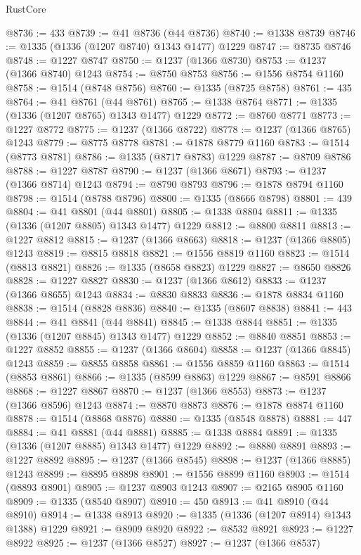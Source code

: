 \begin{lexlean}{RustCore}
\begin{coremodule}
@8736 := 433
@8739 := @41 @8736 (@44 @8736)
@8740 := @1338 @8739
@8746 := @1335 (@1336 (@1207 @8740) @1343 @1477) @1229
@8747 := @8735 @8746
@8748 := @1227 @8747
@8750 := @1237 (@1366 @8730)
@8753 := @1237 (@1366 @8740) @1243
@8754 := @8750 @8753
@8756 := @1556 @8754 @1160
@8758 := @1514 (@8748 @8756)
@8760 := @1335 (@8725 @8758)
@8761 := 435
@8764 := @41 @8761 (@44 @8761)
@8765 := @1338 @8764
@8771 := @1335 (@1336 (@1207 @8765) @1343 @1477) @1229
@8772 := @8760 @8771
@8773 := @1227 @8772
@8775 := @1237 (@1366 @8722)
@8778 := @1237 (@1366 @8765) @1243
@8779 := @8775 @8778
@8781 := @1878 @8779 @1160
@8783 := @1514 (@8773 @8781)
@8786 := @1335 (@8717 @8783) @1229
@8787 := @8709 @8786
@8788 := @1227 @8787
@8790 := @1237 (@1366 @8671)
@8793 := @1237 (@1366 @8714) @1243
@8794 := @8790 @8793
@8796 := @1878 @8794 @1160
@8798 := @1514 (@8788 @8796)
@8800 := @1335 (@8666 @8798)
@8801 := 439
@8804 := @41 @8801 (@44 @8801)
@8805 := @1338 @8804
@8811 := @1335 (@1336 (@1207 @8805) @1343 @1477) @1229
@8812 := @8800 @8811
@8813 := @1227 @8812
@8815 := @1237 (@1366 @8663)
@8818 := @1237 (@1366 @8805) @1243
@8819 := @8815 @8818
@8821 := @1556 @8819 @1160
@8823 := @1514 (@8813 @8821)
@8826 := @1335 (@8658 @8823) @1229
@8827 := @8650 @8826
@8828 := @1227 @8827
@8830 := @1237 (@1366 @8612)
@8833 := @1237 (@1366 @8655) @1243
@8834 := @8830 @8833
@8836 := @1878 @8834 @1160
@8838 := @1514 (@8828 @8836)
@8840 := @1335 (@8607 @8838)
@8841 := 443
@8844 := @41 @8841 (@44 @8841)
@8845 := @1338 @8844
@8851 := @1335 (@1336 (@1207 @8845) @1343 @1477) @1229
@8852 := @8840 @8851
@8853 := @1227 @8852
@8855 := @1237 (@1366 @8604)
@8858 := @1237 (@1366 @8845) @1243
@8859 := @8855 @8858
@8861 := @1556 @8859 @1160
@8863 := @1514 (@8853 @8861)
@8866 := @1335 (@8599 @8863) @1229
@8867 := @8591 @8866
@8868 := @1227 @8867
@8870 := @1237 (@1366 @8553)
@8873 := @1237 (@1366 @8596) @1243
@8874 := @8870 @8873
@8876 := @1878 @8874 @1160
@8878 := @1514 (@8868 @8876)
@8880 := @1335 (@8548 @8878)
@8881 := 447
@8884 := @41 @8881 (@44 @8881)
@8885 := @1338 @8884
@8891 := @1335 (@1336 (@1207 @8885) @1343 @1477) @1229
@8892 := @8880 @8891
@8893 := @1227 @8892
@8895 := @1237 (@1366 @8545)
@8898 := @1237 (@1366 @8885) @1243
@8899 := @8895 @8898
@8901 := @1556 @8899 @1160
@8903 := @1514 (@8893 @8901)
@8905 := @1237 @8903 @1243
@8907 := @2165 @8905 @1160
@8909 := @1335 (@8540 @8907)
@8910 := 450
@8913 := @41 @8910 (@44 @8910)
@8914 := @1338 @8913
@8920 := @1335 (@1336 (@1207 @8914) @1343 @1388) @1229
@8921 := @8909 @8920
@8922 := @8532 @8921
@8923 := @1227 @8922
@8925 := @1237 (@1366 @8527)
@8927 := @1237 (@1366 @8537)

\end{coremodule}
\end{lexlean}
